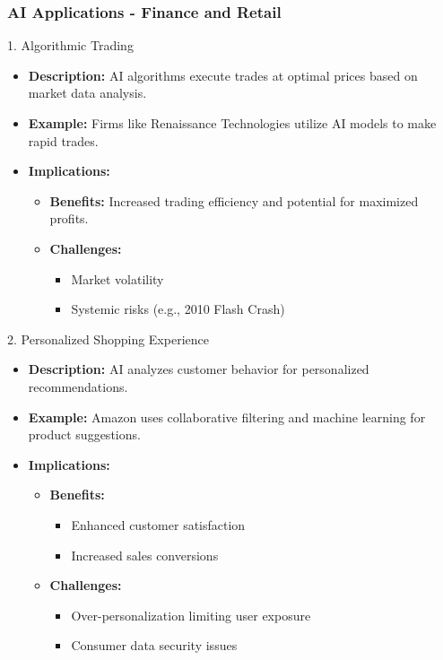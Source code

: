 \documentclass{beamer}
\begin{document}
\begin{frame}[fragile]
    \frametitle{AI Applications - Finance and Retail}
    \begin{block}{1. Algorithmic Trading}
        \begin{itemize}
            \item \textbf{Description:} AI algorithms execute trades at optimal prices based on market data analysis.
            \item \textbf{Example:} Firms like Renaissance Technologies utilize AI models to make rapid trades.
            \item \textbf{Implications:}
                \begin{itemize}
                    \item \textbf{Benefits:} Increased trading efficiency and potential for maximized profits.
                    \item \textbf{Challenges:} 
                        \begin{itemize}
                            \item Market volatility
                            \item Systemic risks (e.g., 2010 Flash Crash)
                        \end{itemize}
                \end{itemize}
        \end{itemize}
    \end{block}
    
    \begin{block}{2. Personalized Shopping Experience}
        \begin{itemize}
            \item \textbf{Description:} AI analyzes customer behavior for personalized recommendations.
            \item \textbf{Example:} Amazon uses collaborative filtering and machine learning for product suggestions.
            \item \textbf{Implications:}
                \begin{itemize}
                    \item \textbf{Benefits:}
                        \begin{itemize}
                            \item Enhanced customer satisfaction
                            \item Increased sales conversions
                        \end{itemize}
                    \item \textbf{Challenges:}
                        \begin{itemize}
                            \item Over-personalization limiting user exposure
                            \item Consumer data security issues
                        \end{itemize}
                \end{itemize}
        \end{itemize}
    \end{block}
\end{frame}
\end{document}
